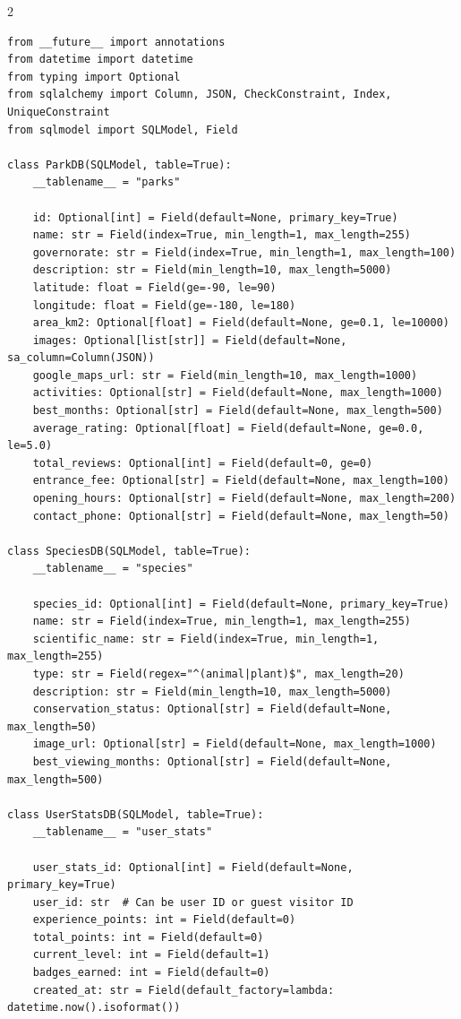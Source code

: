 \documentclass[11pt,a4paper]{article}
\begin{document}
\begin{multicols}{2}
\begin{lstlisting}[caption=Core Database Models]
from __future__ import annotations
from datetime import datetime
from typing import Optional
from sqlalchemy import Column, JSON, CheckConstraint, Index, UniqueConstraint
from sqlmodel import SQLModel, Field

class ParkDB(SQLModel, table=True):
    __tablename__ = "parks"

    id: Optional[int] = Field(default=None, primary_key=True)
    name: str = Field(index=True, min_length=1, max_length=255)
    governorate: str = Field(index=True, min_length=1, max_length=100)
    description: str = Field(min_length=10, max_length=5000)
    latitude: float = Field(ge=-90, le=90)
    longitude: float = Field(ge=-180, le=180)
    area_km2: Optional[float] = Field(default=None, ge=0.1, le=10000)
    images: Optional[list[str]] = Field(default=None, sa_column=Column(JSON))
    google_maps_url: str = Field(min_length=10, max_length=1000)
    activities: Optional[str] = Field(default=None, max_length=1000)
    best_months: Optional[str] = Field(default=None, max_length=500)
    average_rating: Optional[float] = Field(default=None, ge=0.0, le=5.0)
    total_reviews: Optional[int] = Field(default=0, ge=0)
    entrance_fee: Optional[str] = Field(default=None, max_length=100)
    opening_hours: Optional[str] = Field(default=None, max_length=200)
    contact_phone: Optional[str] = Field(default=None, max_length=50)

class SpeciesDB(SQLModel, table=True):
    __tablename__ = "species"

    species_id: Optional[int] = Field(default=None, primary_key=True)
    name: str = Field(index=True, min_length=1, max_length=255)
    scientific_name: str = Field(index=True, min_length=1, max_length=255)
    type: str = Field(regex="^(animal|plant)$", max_length=20)
    description: str = Field(min_length=10, max_length=5000)
    conservation_status: Optional[str] = Field(default=None, max_length=50)
    image_url: Optional[str] = Field(default=None, max_length=1000)
    best_viewing_months: Optional[str] = Field(default=None, max_length=500)

class UserStatsDB(SQLModel, table=True):
    __tablename__ = "user_stats"

    user_stats_id: Optional[int] = Field(default=None, primary_key=True)
    user_id: str  # Can be user ID or guest visitor ID
    experience_points: int = Field(default=0)
    total_points: int = Field(default=0)
    current_level: int = Field(default=1)
    badges_earned: int = Field(default=0)
    created_at: str = Field(default_factory=lambda: datetime.now().isoformat())


\end{lstlisting}
\end{multicols}
\end{document}
